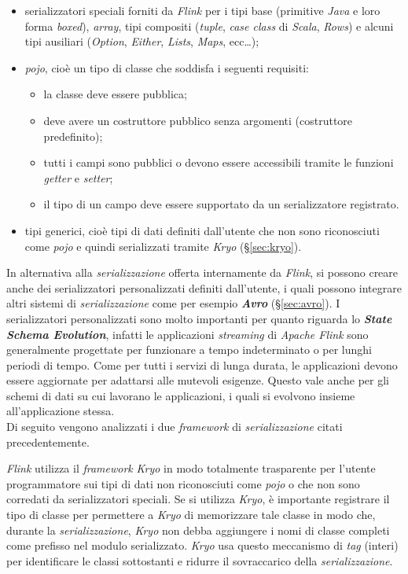 \begin{itemize}
	\item{
serializzatori speciali forniti da \textit{Flink} per i tipi base (primitive \textit{Java} e loro forma \textit{boxed}), \textit{array}, tipi compositi (\textit{tuple}, \textit{case class} di \textit{Scala}, \textit{Rows}) e alcuni tipi ausiliari (\textit{Option}, \textit{Either}, \textit{Lists}, \textit{Maps}, ecc…);}
	\item{\textit{\gls{pojo}}, cioè un tipo di classe che soddisfa i seguenti requisiti:
\begin{itemize}
	\item{la classe deve essere pubblica;}
	\item{deve avere un costruttore pubblico senza argomenti (costruttore predefinito);}
	\item{tutti i campi sono pubblici o devono essere accessibili tramite le funzioni \textit{getter} e \textit{setter};}
	\item{il tipo di un campo deve essere supportato da un serializzatore registrato.}
\end{itemize}}
	\item{tipi generici, cioè tipi di dati definiti dall'utente che non sono riconosciuti come \textit{\gls{pojo}} e quindi serializzati tramite \textit{Kryo} (\S\ref{sec:kryo}).}
\end{itemize}
In alternativa alla \textit{\gls{serializzazione}} offerta internamente da \textit{Flink}, si possono creare anche dei serializzatori personalizzati definiti dall'utente, i quali possono integrare altri sistemi di \textit{\gls{serializzazione}} come per esempio \textbf{\textit{Avro}} (\S\ref{sec:avro}). I serializzatori personalizzati sono molto importanti per quanto riguarda lo \textbf{\textit{State Schema Evolution}}, infatti le applicazioni \textit{streaming} di \textit{Apache Flink} sono generalmente progettate per funzionare a tempo indeterminato o per lunghi periodi di tempo. Come per tutti i servizi di lunga durata, le applicazioni devono essere aggiornate per adattarsi alle mutevoli esigenze. Questo vale anche per gli schemi di dati su cui lavorano le applicazioni, i quali si evolvono insieme all'applicazione stessa.\\
Di seguito vengono analizzati i due \textit{\textit{\gls{framework}}} di \textit{\gls{serializzazione}} citati precedentemente.

\label{sec:kryo}
\noindent \textit{Flink} utilizza il \textit{\textit{\gls{framework}}} \textit{Kryo} in modo totalmente trasparente per l'utente programmatore sui tipi di dati non riconosciuti come \textit{\gls{pojo}} o che non sono corredati da serializzatori speciali. Se si utilizza \textit{Kryo}, è importante registrare il tipo di classe per permettere a \textit{Kryo} di memorizzare tale classe in modo che, durante la \textit{\gls{serializzazione}}, \textit{Kryo} non debba aggiungere i nomi di classe completi come prefisso nel modulo serializzato. \textit{Kryo} usa questo meccanismo di \textit{tag} (interi) per identificare le classi sottostanti e ridurre il sovraccarico della \textit{\gls{serializzazione}}.



